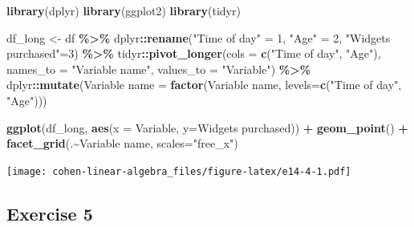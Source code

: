 \documentclass[
]{book}
\newenvironment{Shaded}{\begin{snugshade}}{\end{snugshade}}
\newcommand{\DataTypeTok}[1]{\textcolor[rgb]{0.13,0.29,0.53}{#1}}
\newcommand{\DecValTok}[1]{\textcolor[rgb]{0.00,0.00,0.81}{#1}}
\newcommand{\KeywordTok}[1]{\textcolor[rgb]{0.13,0.29,0.53}{\textbf{#1}}}
\newcommand{\NormalTok}[1]{#1}
\newcommand{\OperatorTok}[1]{\textcolor[rgb]{0.81,0.36,0.00}{\textbf{#1}}}
\newcommand{\StringTok}[1]{\textcolor[rgb]{0.31,0.60,0.02}{#1}}
\begin{document}
\begin{Shaded}
\begin{Highlighting}[]
\KeywordTok{library}\NormalTok{(dplyr)}
\KeywordTok{library}\NormalTok{(ggplot2)}
\KeywordTok{library}\NormalTok{(tidyr)}

\NormalTok{df\_long \textless{}{-}}
\StringTok{  }\NormalTok{df }\OperatorTok{\%\textgreater{}\%}
\StringTok{  }\NormalTok{dplyr}\OperatorTok{::}\KeywordTok{rename}\NormalTok{(}\StringTok{"Time of day"}\NormalTok{ =}\StringTok{ }\DecValTok{1}\NormalTok{, }\StringTok{"Age"}\NormalTok{ =}\StringTok{ }\DecValTok{2}\NormalTok{, }\StringTok{"Widgets purchased"}\NormalTok{=}\DecValTok{3}\NormalTok{) }\OperatorTok{\%\textgreater{}\%}
\StringTok{  }\NormalTok{tidyr}\OperatorTok{::}\KeywordTok{pivot\_longer}\NormalTok{(}\DataTypeTok{cols =} \KeywordTok{c}\NormalTok{(}\StringTok{"Time of day"}\NormalTok{, }\StringTok{"Age"}\NormalTok{), }\DataTypeTok{names\_to =} \StringTok{"Variable name"}\NormalTok{, }\DataTypeTok{values\_to =} \StringTok{"Variable"}\NormalTok{) }\OperatorTok{\%\textgreater{}\%}
\StringTok{  }\NormalTok{dplyr}\OperatorTok{::}\KeywordTok{mutate}\NormalTok{(}\StringTok{\textasciigrave{}}\DataTypeTok{Variable name}\StringTok{\textasciigrave{}}\NormalTok{ =}\StringTok{ }\KeywordTok{factor}\NormalTok{(}\StringTok{\textasciigrave{}}\DataTypeTok{Variable name}\StringTok{\textasciigrave{}}\NormalTok{, }\DataTypeTok{levels=}\KeywordTok{c}\NormalTok{(}\StringTok{"Time of day"}\NormalTok{, }\StringTok{"Age"}\NormalTok{)))}

\KeywordTok{ggplot}\NormalTok{(df\_long, }\KeywordTok{aes}\NormalTok{(}\DataTypeTok{x =}\NormalTok{ Variable, }\DataTypeTok{y=}\StringTok{\textasciigrave{}}\DataTypeTok{Widgets purchased}\StringTok{\textasciigrave{}}\NormalTok{)) }\OperatorTok{+}\StringTok{ }
\StringTok{  }\KeywordTok{geom\_point}\NormalTok{() }\OperatorTok{+}\StringTok{ }
\StringTok{  }\KeywordTok{facet\_grid}\NormalTok{(.}\OperatorTok{\textasciitilde{}}\StringTok{\textasciigrave{}}\DataTypeTok{Variable name}\StringTok{\textasciigrave{}}\NormalTok{, }\DataTypeTok{scales=}\StringTok{"free\_x"}\NormalTok{)}
\end{Highlighting}
\end{Shaded}

\texttt{[image: cohen-linear-algebra\_files/figure-latex/e14-4-1.pdf]}

\hypertarget{exercise-5}{%
\subsection*{Exercise 5}\label{exercise-5}}
\end{document}
